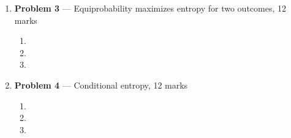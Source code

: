 \documentclass[11pt]{article}
\theoremstyle{definition}
\begin{document}
\begin{enumerate}
	
	
	\item[] \textbf{Problem 3} --- Equiprobability maximizes entropy for two outcomes, 12 marks
	
	
	\begin{enumerate}
		\item
		\item
		
		\item
	
	\end{enumerate}
	
	\item[] \textbf{Problem 4} --- Conditional entropy, 12 marks
		
		\begin{enumerate}
			\item
			
			\item
			\item
		\end{enumerate}
	\end{enumerate}
	
\end{document}
